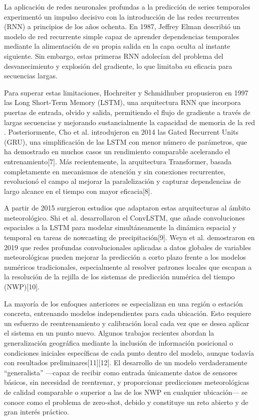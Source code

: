 La aplicación de redes neuronales profundas a la predicción de series temporales experimentó un impulso decisivo con la introducción de las redes recurrentes (RNN)
a principios de los años ochenta. En 1987, Jeffrey Elman describió un modelo de red recurrente simple capaz de aprender dependencias temporales mediante la alimentación
de su propia salida en la capa oculta al instante siguiente\cite{elman1990}. Sin embargo, estas primeras RNN adolecían del problema del desvanecimiento y explosión del gradiente, lo
que limitaba su eficacia para secuencias largas.

Para superar estas limitaciones, Hochreiter y Schmidhuber propusieron en 1997 las Long Short-Term Memory (LSTM), una arquitectura RNN que incorpora puertas de entrada,
olvido y salida, permitiendo el flujo de gradiente a través de largas secuencias y mejorando sustancialmente la capacidad de memoria de la red \cite{hochreiter1997}.
Posteriormente, Cho et al. introdujeron en 2014 las Gated Recurrent Units (GRU), una simplificación de las LSTM con menor número de parámetros,
que ha demostrado en muchos casos un rendimiento comparable acelerando el entrenamiento[7]. 
Más recientemente, la arquitectura Transformer, basada completamente en mecanismos de atención y sin conexiones recurrentes, revolucionó el campo al
mejorar la paralelización y capturar dependencias de largo alcance en el tiempo con mayor eficacia[8].

A partir de 2015 surgieron estudios que adaptaron estas arquitecturas al ámbito meteorológico. Shi et al. desarrollaron el ConvLSTM, que añade convoluciones espaciales a
la LSTM para modelar simultáneamente la dinámica espacial y temporal en tareas de nowcasting de precipitación[9]. Weyn et al. demostraron en 2019 que redes
profundas convolucionales aplicadas a datos globales de variables meteorológicas pueden mejorar la predicción a corto plazo frente a los modelos numéricos tradicionales,
especialmente al resolver patrones locales que escapan a la resolución de la rejilla de los sistemas de predicción numérica del tiempo (NWP)[10].

La mayoría de los enfoques anteriores se especializan en una región o estación concreta, entrenando modelos independientes para cada ubicación. Esto requiere un esfuerzo de
reentrenamiento y calibración local cada vez que se desea aplicar el sistema en un punto nuevo. Algunos trabajos recientes abordan la generalización geográfica mediante la
 inclusión de información posicional o condiciones iniciales específicas de cada punto dentro del modelo, aunque todavía con resultados preliminares[11][12]. 
El desarrollo de un modelo verdaderamente “generalista” —capaz de recibir como entrada únicamente datos de sensores básicos, sin necesidad de reentrenar, y proporcionar predicciones meteorológicas
de calidad comparable o superior a las de los NWP en cualquier ubicación— se conoce como el problema de zero-shot, debido 
y constituye un reto abierto y de gran interés práctico.

